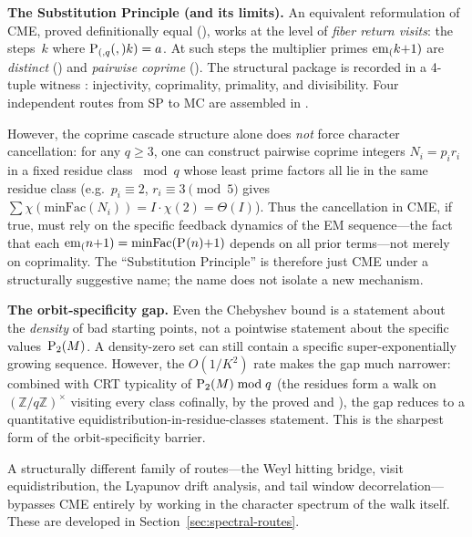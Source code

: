 \begin{remark}
\medskip
\noindent\textbf{The Substitution Principle (and its limits).}\enspace
An equivalent reformulation of CME, proved definitionally equal
(), works at the level of \emph{fiber return visits}:
the steps~$k$ where $\mathrm{P}_{(,q}(,)k) = a$.  At such steps the multiplier
primes $\mathrm{em}_{(}k{+}1)$ are \emph{distinct} ()
and \emph{pairwise coprime} ().
The structural package is recorded in a 4-tuple witness
: injectivity, coprimality, primality,
and divisibility.  Four independent routes from SP to MC are assembled
in .

However, the coprime cascade structure alone does \emph{not} force
character cancellation: for any $q \geq 3$, one can construct
pairwise coprime integers $N_i = p_i r_i$ in a fixed residue class
$\bmod q$ whose least prime factors all lie in the same residue class
(e.g.\ $p_i \equiv 2$, $r_i \equiv 3 \pmod{5}$ gives
$\sum \chi(\mathrm{minFac}(N_i)) = I \cdot \chi(2) = \Theta(I)$).
Thus the cancellation in CME, if true, must rely on the specific
feedback dynamics of the EM sequence---the fact that each
$\mathrm{em}_{(}n{+}1) = \mathrm{minFac}(\mathrm{P}_{}(n){+}1)$ depends on all prior
terms---not merely on coprimality.  The ``Substitution Principle'' is
therefore just CME under a structurally suggestive name; the name does
not isolate a new mechanism.

\medskip
\noindent\textbf{The orbit-specificity gap.}\enspace
Even the Chebyshev bound is a statement about the \emph{density} of
bad starting points, not a pointwise statement about the specific
values~$\mathrm{P}_{2}(M)$.  A density-zero set can still contain a
specific super-exponentially growing sequence.  However, the
$O(1/K^2)$ rate makes the gap much narrower: combined with CRT
typicality of $\mathrm{P}_{2}(M) \bmod q$ (the residues form a walk on
$(\mathbb{Z}/q\mathbb{Z})^\times$ visiting every class cofinally, by
the proved  and
), the gap reduces to a quantitative
equidistribution-in-residue-classes statement.  This is the sharpest
form of the orbit-specificity barrier.
\end{remark}


A structurally different family of routes---the Weyl hitting bridge,
visit equidistribution, the Lyapunov drift analysis, and tail window
decorrelation---bypasses CME entirely by working in the character
spectrum of the walk itself.  These are developed in
Section~\ref{sec:spectral-routes}.

